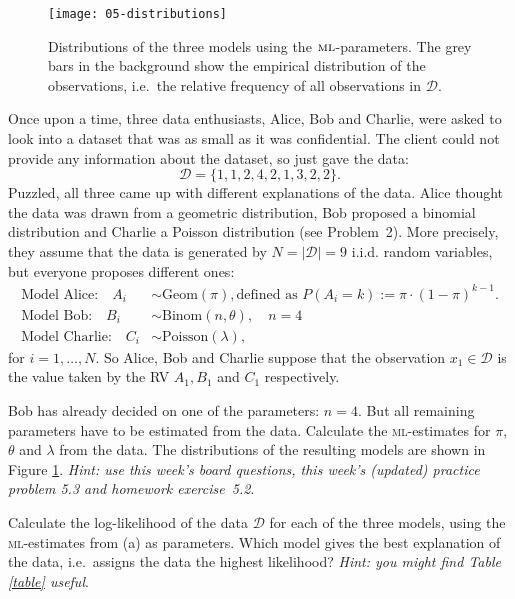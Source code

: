 \documentclass[a4paper,10pt,landscape,twocolumn]{scrartcl}
\begin{document}
\begin{figure}
  \texttt{[image: 05-distributions]}
  \caption{Distributions of the three models using the
  $\textsc{ml}$-parameters. The grey bars in the background show the empirical
  distribution of the observations, i.e.\ the relative frequency of all
  observations in $\mathcal{D}$.
  \label{fig:models}}
\end{figure}

\begin{exercise}
  Once upon a time, three data enthusiasts, Alice, Bob and Charlie, were asked
  to look into a dataset that was as small as it was confidential. The client
  could not provide any information about the dataset, so just gave the data:
  \[
    \mathcal{D} = \{ 1, 1, 2, 4, 2, 1, 3, 2, 2 \}.
  \]
  Puzzled, all three came up with different explanations of the data. Alice
  thought the data was drawn from a geometric distribution, Bob proposed a
  binomial distribution and Charlie a Poisson distribution (see Problem~2).
  More precisely, they assume that the data is generated by 
  $N = |\mathcal D|=9$ i.i.d. random variables, but everyone proposes different
  ones:
  \begin{align*}
    \text{Model Alice:} 
      \quad A_i &\sim \text{Geom}(\pi), 
        \mbox{defined as $P(A_i=k):=\pi \cdot (1-\pi)^{k-1}$.}
    \\
	\text{Model Bob:} 
      \quad B_i &\sim \text{Binom}(n, \theta), 
      \quad n=4
    \\
	\text{Model Charlie:} 
      \quad C_i &\sim \text{Poisson}(\lambda),
  \end{align*}
  for $i = 1, \dots, N$. So Alice, Bob and Charlie suppose that the observation
  $x_1 \in \mathcal D$ is the value taken by the RV $A_1, B_1$ and $C_1$
  respectively.

  \begin{subex}[1pt]
    Bob has already decided on one of the parameters: $n=4$. But all remaining
    parameters have to be estimated from the data. Calculate the
    \textsc{ml}-estimates for $\pi$, $\theta$ and $\lambda$ from the data. The
    distributions of the resulting models are shown in Figure \ref{fig:models}.
    \emph{Hint: use this week's board questions, this week's (updated) practice
    problem 5.3 and homework exercise~5.2}.
  \end{subex}

  \begin{subex}[1pt]
    Calculate the log-likelihood of the data $\mathcal D$ for each of the three
    models, using the \textsc{ml}-estimates from (a) as parameters. Which model
    gives the best explanation of the data, i.e.\ assigns the data the highest
    likelihood? \emph{Hint: you might find Table \ref{table} useful}.
  \end{subex}


\end{exercise}
\end{document}
